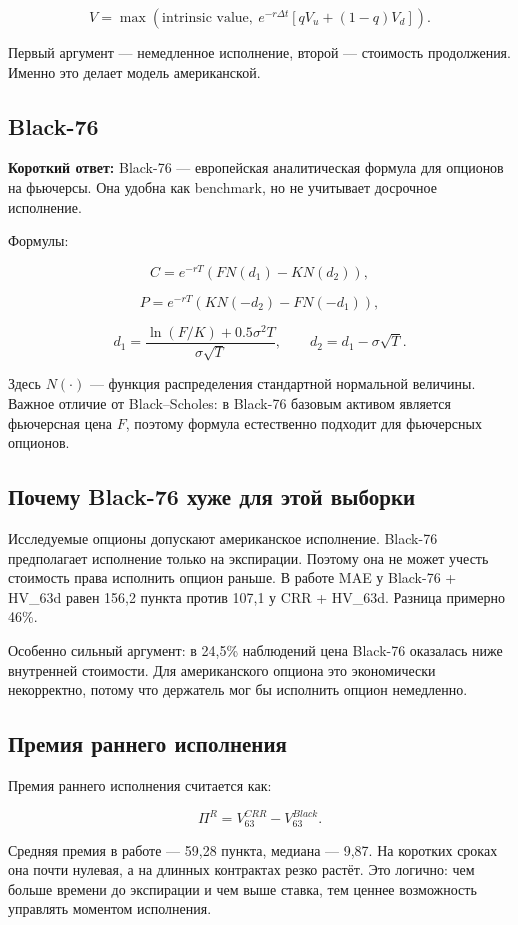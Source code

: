 \documentclass[11pt,a4paper]{article}
\newcommand{\answerbox}[1]{%
  \noindent\colorbox{softblue}{%
    \parbox{\dimexpr\linewidth-2\fboxsep\relax}{\textbf{Короткий ответ:} #1}%
  }\par\vspace{0.2em}
}
\begin{document}
\[
V=\max\left(\text{intrinsic value},\ e^{-r\Delta t}\left[qV_u+(1-q)V_d\right]\right).
\]

Первый аргумент --- немедленное исполнение, второй --- стоимость продолжения. Именно это делает модель американской.

\subsection{Black-76}

\answerbox{Black-76 --- европейская аналитическая формула для опционов на фьючерсы. Она удобна как benchmark, но не учитывает досрочное исполнение.}

Формулы:

\[
C=e^{-rT}\left(FN(d_1)-KN(d_2)\right),
\]

\[
P=e^{-rT}\left(KN(-d_2)-FN(-d_1)\right),
\]

\[
d_1=\frac{\ln(F/K)+0.5\sigma^2T}{\sigma\sqrt{T}}, \qquad
d_2=d_1-\sigma\sqrt{T}.
\]

Здесь $N(\cdot)$ --- функция распределения стандартной нормальной величины. Важное отличие от Black--Scholes: в Black-76 базовым активом является фьючерсная цена $F$, поэтому формула естественно подходит для фьючерсных опционов.

\subsection{Почему Black-76 хуже для этой выборки}

Исследуемые опционы допускают американское исполнение. Black-76 предполагает исполнение только на экспирации. Поэтому она не может учесть стоимость права исполнить опцион раньше. В работе MAE у Black-76 + HV\_63d равен 156,2 пункта против 107,1 у CRR + HV\_63d. Разница примерно 46\%.

Особенно сильный аргумент: в 24,5\% наблюдений цена Black-76 оказалась ниже внутренней стоимости. Для американского опциона это экономически некорректно, потому что держатель мог бы исполнить опцион немедленно.

\subsection{Премия раннего исполнения}

Премия раннего исполнения считается как:

\[
\Pi^R=V^{CRR}_{63}-V^{Black}_{63}.
\]

Средняя премия в работе --- 59,28 пункта, медиана --- 9,87. На коротких сроках она почти нулевая, а на длинных контрактах резко растёт. Это логично: чем больше времени до экспирации и чем выше ставка, тем ценнее возможность управлять моментом исполнения.
\end{document}
